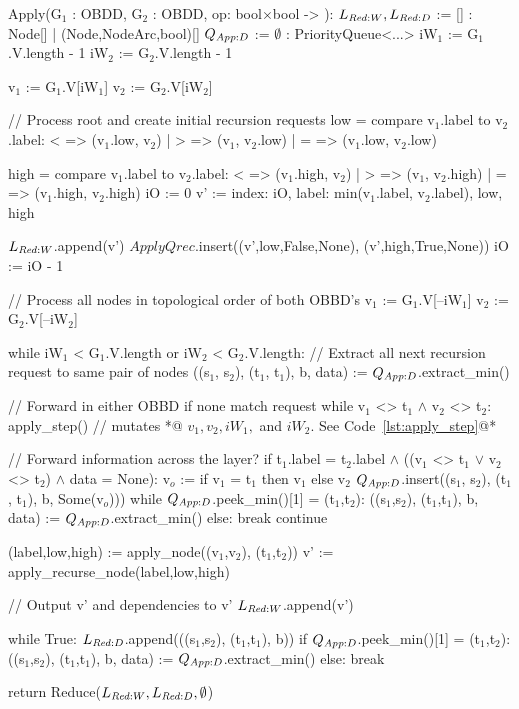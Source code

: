 \begin{blstlisting}
  Apply(G$_1$ : OBDD, G$_2$ : OBDD, op: bool$\times$bool -> ):
     $\ReduceLwork, \ReduceLdep$ := [] : Node[] | (Node,NodeArc,bool)[]
     $\ApplyQrec$ := $\emptyset$ : PriorityQueue<...>
     iW$_1$ := G$_1$.V.length - 1
     iW$_2$ := G$_2$.V.length - 1

     v$_1$ := G$_1$.V[iW$_1$]
     v$_2$ := G$_2$.V[iW$_2$]

     // Process root and create initial recursion requests
     low = compare v$_1$.label to v$_2$.label:  <  => (v$_1$.low, v$_2$)
                                       | > => (v$_1$, v$_2$.low)
                                       | = => (v$_1$.low, v$_2$.low)

     high = compare v$_1$.label to v$_2$.label:  <  => (v$_1$.high, v$_2$)
                                        | > => (v$_1$, v$_2$.high)
                                        | = => (v$_1$.high, v$_2$.high)
     iO := 0
     v' := { index: iO, label: min(v$_1$.label, v$_2$.label), low, high }

     $\ReduceLwork$.append(v')
     $ApplyQrec$.insert((v',low,False,None), (v',high,True,None))
     iO := iO - 1

     // Process all nodes in topological order of both OBBD's
     v$_1$ := G$_1$.V[--iW$_1$]
     v$_2$ := G$_2$.V[--iW$_2$]

     while iW$_1$ < G$_1$.V.length or iW$_2$ < G$_2$.V.length:
         // Extract all next recursion request to same pair of nodes
         ((s$_1$, s$_2$), (t$_1$, t$_1$), b, data) := $\ApplyQrec$.extract_min()

         // Forward in either OBBD if none match request
         while v$_1$ <> t$_1$ $\land$ v$_2$ <> t$_2$:
            apply_step() // mutates *@\color{gray} $v_1, v_2, \mathit{iW}_1,$ and $\mathit{iW}_2$. See Code~\ref{lst:apply_step}@*

         // Forward information across the layer?
         if t$_1$.label = t$_2$.label $\land$ ((v$_1$ <> t$_1$ $\lor$ v$_2$ <> t$_2$) $\land$ data = None):
             v$_o$ := if v$_1$ = t$_1$ then v$_1$ else v$_2$
             $\ApplyQrec$.insert((s$_1$, s$_2$), (t$_1$, t$_1$), b, Some(v$_o$)))
             while $\ApplyQrec$.peek_min()[1] = (t$_1$,t$_2$):
                     ((s$_1$,s$_2$), (t$_1$,t$_1$), b, data) := $\ApplyQrec$.extract_min()
             else: break
             continue

         (label,low,high) := apply_node((v$_1$,v$_2$), (t$_1$,t$_2$))
         v' := apply_recurse_node(label,low,high)

         // Output v' and dependencies to v'
         $\ReduceLwork$.append(v')

         while True:
             $\ReduceLdep$.append(((s$_1$,s$_2$), (t$_1$,t$_1$), b))
             if $\ApplyQrec$.peek_min()[1] = (t$_1$,t$_2$):
                 ((s$_1$,s$_2$), (t$_1$,t$_1$), b, data) := $\ApplyQrec$.extract_min()
             else: break

     return Reduce($\ReduceLwork, \ReduceLdep, \emptyset$)
\end{blstlisting}

